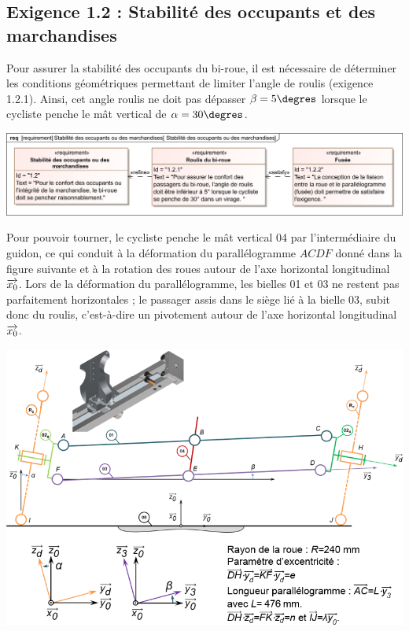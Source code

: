 \documentclass[10pt,fleqn]{article} %
\begin{document}
\begin{multicols}{2}
\subsection*{Exigence 1.2 : Stabilité des occupants et des marchandises}

\begin{obj}
Pour assurer la stabilité des occupants du bi-roue, il est nécessaire de déterminer les conditions géométriques permettant de limiter l’angle de roulis (exigence 1.2.1). Ainsi, cet angle roulis ne doit pas dépasser $\beta=5\degres$  lorsque le cycliste  penche le mât vertical de $\alpha=30\degres$.
\end{obj}

\begin{center}
\includegraphics[width=\linewidth]{images/req_01.png}
\end{center}
Pour pouvoir tourner, le cycliste penche le mât vertical 04 par l’intermédiaire du guidon, ce qui conduit à la déformation du parallélogramme $ACDF$ donné dans la figure suivante et à la rotation des roues autour de l’axe horizontal longitudinal
$\overrightarrow{x_0}$. Lors de la déformation du parallélogramme, les bielles 01 et 03 ne restent pas parfaitement horizontales ; le passager assis dans le siège lié à la bielle 03, subit donc du roulis, c’est-à-dire un pivotement autour de l’axe horizontal longitudinal $\overrightarrow{x_0}$.

\begin{center}
\includegraphics[width=\linewidth]{images/add_05.png}
\end{center}


\end{multicols}
\end{document}

